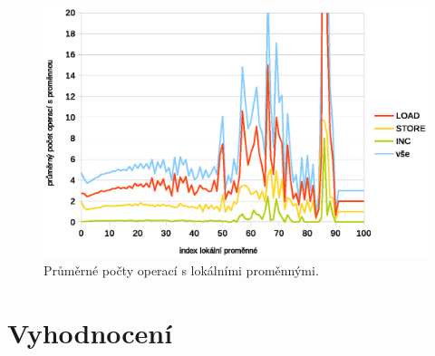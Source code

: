 \begin{figure}[h!]
\centering
\includegraphics[scale=0.9]{fig/locals} 
\caption{Průměrné počty operací s lokálními proměnnými.}\label{vars}
\end{figure}

\section{Vyhodnocení}\label{AnalysisSummary}
